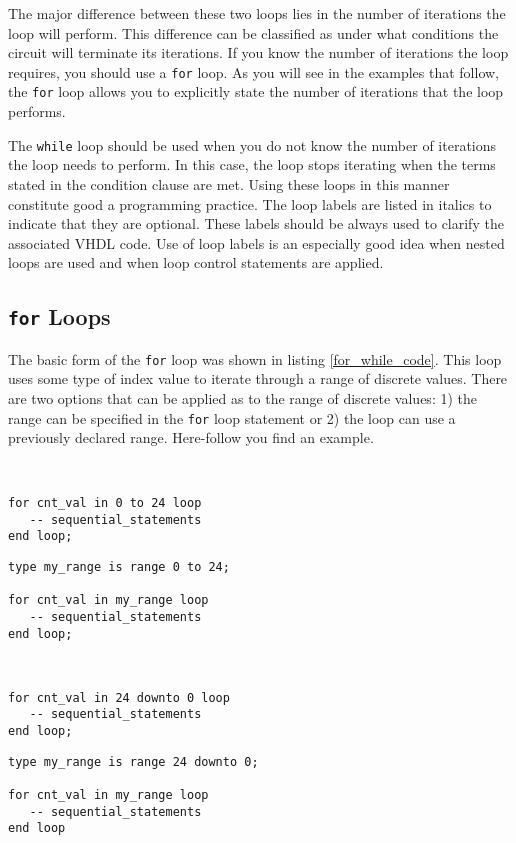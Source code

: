 The major difference between these two loops lies in the number of iterations the loop will perform. This difference can be classified as under what conditions the circuit will terminate its iterations. If you know the number of iterations the loop requires, you should use a \texttt{for} loop. As you will see in the examples that follow, the \texttt{for} loop allows you to explicitly state the number of iterations that the loop performs. 

The \texttt{while} loop should be used when you do not know the number of iterations the loop needs to perform. In this case, the loop stops iterating when the terms stated in the condition clause are met. Using these loops in this manner constitute good a programming practice. The loop labels are listed in italics to indicate that they are optional. These labels should be always used to clarify the associated VHDL code. Use of loop labels is an especially good idea when nested loops are used and when loop control statements are applied. 

\subsection{\texttt{for} Loops}
The basic form of the \texttt{for} loop was shown in listing \ref{for_while_code}. This loop uses some type of index value to iterate through a range of discrete values. There are two options that can be applied as to the range of discrete values: 1) the range can be specified in the \texttt{for} loop statement or 2) the loop can use a previously declared range. Here-follow you find  an example.

\vspace{10pt}
\noindent
\begin{minipage}{0.5\linewidth}
\begin{lstlisting}


for cnt_val in 0 to 24 loop
   -- sequential_statements
end loop; 
\end{lstlisting}
\end{minipage}
\noindent
\begin{minipage}{0.5\linewidth}
\begin{lstlisting}
type my_range is range 0 to 24; 

for cnt_val in my_range loop
   -- sequential_statements
end loop; 
\end{lstlisting}
\end{minipage}
\noindent
\begin{minipage}{0.5\linewidth}
\begin{lstlisting}


for cnt_val in 24 downto 0 loop
   -- sequential_statements
end loop; 
\end{lstlisting}
\end{minipage}
\noindent
\begin{minipage}{0.5\linewidth}
\begin{lstlisting}
type my_range is range 24 downto 0; 

for cnt_val in my_range loop
   -- sequential_statements
end loop
\end{lstlisting}
\end{minipage}

